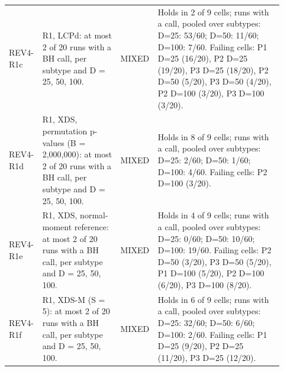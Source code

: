 \begin{table}[p]
\begin{tabular}{@{}>{\raggedright\arraybackslash}p{0.100\linewidth}>{\raggedright\arraybackslash}p{0.285\linewidth}>{\raggedright\arraybackslash}p{0.085\linewidth}>{\raggedright\arraybackslash}p{0.450\linewidth}@{}}
REV4-R1c & R1, LCPd: at most 2 of 20 runs with a BH call, per subtype and D = 25, 50, 100. & MIXED & Holds in 2 of 9 cells; runs with a call, pooled over subtypes: D=25: 53/60; D=50: 11/60; D=100: 7/60. Failing cells: P1 D=25 (16/20), P2 D=25 (19/20), P3 D=25 (18/20), P2 D=50 (5/20), P3 D=50 (4/20), P2 D=100 (3/20), P3 D=100 (3/20). \\
REV4-R1d & R1, XDS, permutation p-values (B = 2,000,000): at most 2 of 20 runs with a BH call, per subtype and D = 25, 50, 100. & MIXED & Holds in 8 of 9 cells; runs with a call, pooled over subtypes: D=25: 2/60; D=50: 1/60; D=100: 4/60. Failing cells: P2 D=100 (3/20). \\
REV4-R1e & R1, XDS, normal-moment reference: at most 2 of 20 runs with a BH call, per subtype and D = 25, 50, 100. & MIXED & Holds in 4 of 9 cells; runs with a call, pooled over subtypes: D=25: 0/60; D=50: 10/60; D=100: 19/60. Failing cells: P2 D=50 (3/20), P3 D=50 (5/20), P1 D=100 (5/20), P2 D=100 (6/20), P3 D=100 (8/20). \\
REV4-R1f & R1, XDS-M (S = 5): at most 2 of 20 runs with a BH call, per subtype and D = 25, 50, 100. & MIXED & Holds in 6 of 9 cells; runs with a call, pooled over subtypes: D=25: 32/60; D=50: 6/60; D=100: 2/60. Failing cells: P1 D=25 (9/20), P2 D=25 (11/20), P3 D=25 (12/20). \\
\bottomrule
\end{tabular}
\end{table}


